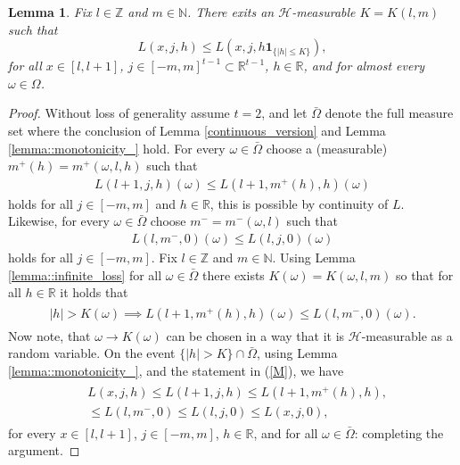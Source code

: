 \documentclass[a4paper]{article}
\newtheorem{lemma}[theorem]{Lemma}
\newcommand{\indicator}[1]{\mathbf{1}_{\{ #1 \}}}
\begin{document}
\begin{lemma}\label{lemma::kettes}
Fix $l \in \mathbb{Z}$ and $m \in \mathbb{N}$. There exits an $\mathcal{H}$-measurable $K = K(l,m)$ such that 
\begin{equation}\label{majus6}
L(x,j, h) \leq L(x, j, h \indicator{|h|\leq K}),
\end{equation}
for all $x \in [l,l+1]$, $j \in [-m,m]^{t-1} \subset \mathbb{R}^{t-1}$, $h \in \mathbb{R}$, and for almost every $\omega \in \Omega$.
\end{lemma}

\begin{proof}
Without loss of generality assume $t=2$, and let $\bar \Omega$ denote the full measure set 
where the conclusion of Lemma \ref{continuous_version} and Lemma \ref{lemma::monotonicity_} hold. 
For every $\omega \in \bar \Omega$ choose a (measurable) $m^{+}(h) = m^{+}(\omega, l,h)$ such that  
\begin{align*}
L(l+1, j, h)(\omega) \leq 
L(l+1, m^{+}(h), h)(\omega)
\end{align*}
holds for all $j \in [-m,m]$ and $h \in \mathbb{R}$, this is possible by continuity of $L$. Likewise, for every $\omega \in\bar \Omega$ choose $m^{-} = m^{-}(\omega, l)$ such that  
\begin{align*}
L(l, m^{-}, 0)(\omega) \leq 
L(l, j, 0)(\omega)
\end{align*}
holds for all $j\in[-m,m]$.
Fix $l \in \mathbb{Z}$ and $m \in \mathbb{N}$. Using Lemma \ref{lemma::infinite_loss} for all $\omega \in \bar\Omega$ there exists $K(\omega) = K(\omega, l, m)$ so that for all $h \in \mathbb{R}$ it holds that
\begin{align}\label{M}
\begin{split}
|h| > K(\omega) \implies L(l+1, m^{+}(h), h)(\omega) \leq L(l, m^{-}, 0)(\omega).
\end{split}
\end{align}
Now note, that $\omega \to K(\omega)$ can be chosen in a way that it is $\mathcal{H}$-measurable as a random variable. On the event $\{|h| > K\} \cap \bar \Omega$, using Lemma \ref{lemma::monotonicity_}, and the statement in (\ref{M}), we have 
\begin{align}\label{boundidstratineq}
\begin{split}
&L(x, j, h) \leq L(l+1, j, h) \leq 
L(l+1, m^{+}(h), h),
\\
&\leq L(l, m^{-}, 0) \leq  L(l, j, 0) \leq 
L(x, j, 0),
\end{split}
\end{align}
for every $x \in [l,l+1]$, $j \in [-m,m]$, $h\in \mathbb{R}$, and for all $\omega \in \bar \Omega$: completing the argument.
\end{proof}
\end{document}
